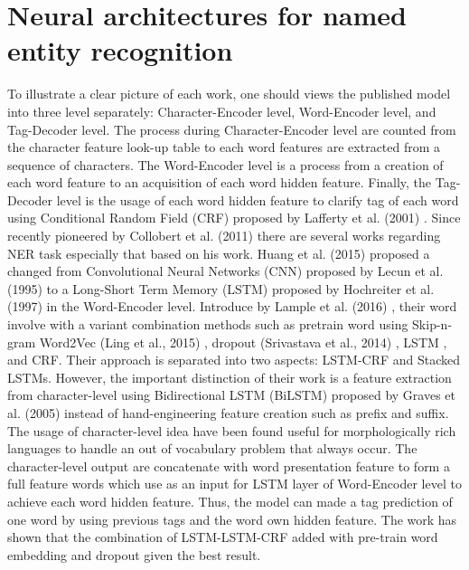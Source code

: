 \section{Neural architectures for named entity recognition}
To illustrate a clear picture of each work, one should views the published model into three level separately: Character-Encoder level, Word-Encoder level, and Tag-Decoder level.
The process during Character-Encoder level are counted from the character feature look-up table to each word features are extracted from a sequence of characters.
The Word-Encoder level is a process from a creation of each word feature to an acquisition of each word hidden feature.
Finally, the Tag-Decoder level is the usage of each word hidden feature to clarify tag of each word using Conditional Random Field (CRF) proposed by Lafferty et al. (2001) \cite{Lafferty:2001:CRF:645530.655813}.
Since recently pioneered by Collobert et al. (2011) \cite{DBLP:journals/corr/abs-1103-0398} there are several works regarding NER task especially that based on his work. Huang et al. (2015) \cite{DBLP:journals/corr/HuangXY15} proposed a changed from Convolutional Neural Networks (CNN) proposed by Lecun et al. (1995) \cite{lecun1995convolutional} to a Long-Short Term Memory (LSTM) proposed by Hochreiter et al. (1997) \cite{DBLP:journals/neco/HochreiterS97} in the Word-Encoder level.
Introduce by Lample et al. (2016) \cite{DBLP:journals/corr/LampleBSKD16}, their word involve with a variant combination methods such as pretrain word using Skip-n-gram Word2Vec (Ling et al., 2015) \cite{DBLP:journals/corr/LingLMAADBT15}, dropout (Srivastava et al., 2014) \cite{JMLR:v15:srivastava14a}, LSTM , and CRF.
Their approach is separated into two aspects: LSTM-CRF and Stacked LSTMs.
However, the important distinction of their work is a feature extraction from character-level using Bidirectional LSTM (BiLSTM) proposed by Graves et al. (2005) \cite{graves2005framewise} instead of hand-engineering feature creation such as prefix and suffix.
The usage of character-level idea have been found useful for morphologically rich languages to handle an out of vocabulary problem that always occur.
The character-level output are concatenate with word presentation feature to form a full feature words which use as an input for LSTM layer of Word-Encoder level to achieve each word hidden feature.
Thus, the model can made a tag prediction of one word by using previous tags and the word own hidden feature.
The work has shown that the combination of LSTM-LSTM-CRF added with pre-train word embedding and dropout given the best result.
